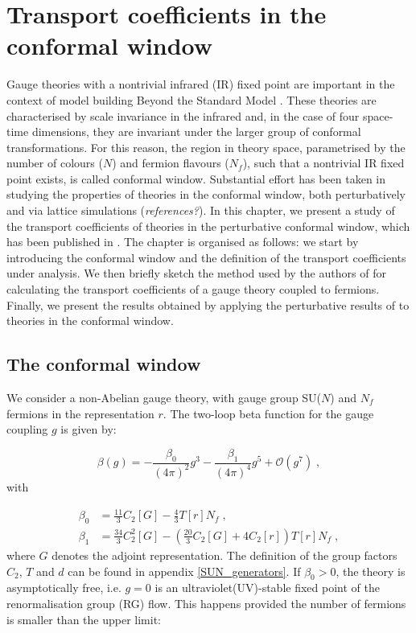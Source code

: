 \chapter{Transport coefficients in the conformal window}

Gauge theories with a nontrivial infrared (IR) fixed point are important in the context of model building Beyond the Standard Model \cite{Sannino:2008ha}. These theories are characterised by scale invariance in the infrared and, in the case of four space-time dimensions, they are invariant under the larger group of conformal transformations. For this reason, the region in theory space, parametrised by the number of colours ($N$) and fermion flavours ($N_f$), such that a nontrivial IR fixed point exists, is called conformal window.
Substantial effort has been taken in studying the properties of theories in the conformal window, both perturbatively and via lattice simulations (\emph{references?}). In this chapter, we present a study of the transport coefficients of theories in the perturbative conformal window, which has been published in \cite{Toniato:2016twr}.
The chapter is organised as follows: we start by introducing the conformal window and the definition of the transport coefficients under analysis. We then briefly sketch the method used by the authors of \cite{Arnold:2000dr} for calculating the transport coefficients of a gauge theory coupled to fermions. Finally, we present the results obtained by applying the perturbative results of \cite{Arnold:2000dr} to theories in the conformal window. 


\section{The conformal window}
\label{ conformal_window}

We consider a non-Abelian gauge theory, with gauge group SU($N$) and $N_f$ fermions in the representation $r$. The two-loop beta function for the gauge coupling $g$ is given by:

 \begin{equation}
 \beta (g) = - \frac{\beta_0}{(4\pi)^2} g^3 - \frac{\beta_1}{(4\pi)^4} g^5 + \mathcal{O}(g^{7}) \; ,
 \label{beta_f}
 \end{equation}
%
with

 \begin{align}
\beta_0 &= \frac{11}{3} C_2[G] - \frac{4}{3} T[r] N_f\; , \\
\beta_1 &= \frac{34}{3} C_2^2[G] - \left ( \frac{20}{3} C_2[G] + 4 C_2[r] \right ) T[r] N_f\; ,
\end{align}
%
where $G$ denotes the adjoint representation. The definition of the group factors $C_2$, $T$ and $d$ can be found in appendix \ref{SUN_generators}. If $\beta_0 > 0$, the theory is asymptotically free, i.e. $g=0$ is an ultraviolet(UV)-stable fixed point of the renormalisation group (RG) flow. This happens provided the number of fermions is smaller than the upper limit:


